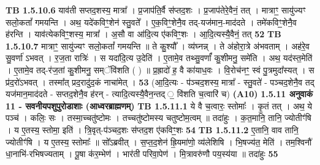 \documentclass[17pt]{extarticle}
\begin{document}
                  \newline
                                \textbf{ TB 1.5.10.6} \newline
                  याव॑ती सप्तद॒शस्य॒ मात्रा᳚ । प्र॒जाप॑ति॒र्वै स॑प्तद॒शः । प्र॒जाप॑तेरे॒वैनं॒ तत् । मात्राꣳ॒॒ सायु॑ज्यꣳ सलो॒कतां᳚ गमयन्ति । अथ॒ यदे॑कविꣳ॒॒शेन॑ स्तु॒वते᳚ । ए॒क॒विꣳ॒॒शेनै॒व तद्-यज॑मान॒-माद॑दते । तमे॑कविꣳ॒॒शेनै॒व ह॑रन्ति । याव॑त्येकविꣳ॒॒शस्य॒ मात्रा᳚ । अ॒सौ वा आ॑दि॒त्य ए॑कविꣳ॒॒शः । आ॒दि॒त्यस्यै॒वैनं॒ तत् \textbf{ 52} \newline
                  \newline
                                \textbf{ TB 1.5.10.7} \newline
                  मात्राꣳ॒॒ सायु॑ज्यꣳ सलो॒कतां᳚ गमयन्ति ॥ ते कु॒श्यौ᳚ । व्य॑घ्नन्न् । ते अ॑होरा॒त्रे अ॑भवताम् । अह॑रे॒व सु॒वर्णा॑ ऽभवत् । र॒ज॒ता रात्रिः॑ । स यदा॑दि॒त्य उ॒देति॑ । ए॒तामे॒व तथ्सु॒वर्णां᳚ कु॒शीमनु॒ समे॑ति । अथ॒ यद॑स्त॒मेति॑ । ए॒तामे॒व तद्-र॑ज॒तां कु॒शीमनु॒ सम्ॅवि॑शति ( ) ॥ प्र॒ह्रादो॑ ह॒ वै का॑याध॒वः । वि॒रोच॑नꣳ॒॒ स्वं पु॒त्रमुदा᳚स्यत् । स प्र॑द॒रो॑ऽभवत् । तस्मा᳚त् प्रद॒रादु॑द॒कं नाचा॑मेत् । \textbf{ 53} \newline
                  \newline
                                    (आ॒दि॒त्यः - प॑ञ्चद॒शस्य॒ मात्रा᳚ - स्तु॒वते॑ - पञ्चद॒शेनै॒व तद् यज॑मान॒माद॑दते - सप्तद॒शेनै॒व ह॑रन् - त्यादि॒त्यस्यै॒वैन॒न्तद् ॒ वि॑शति च॒त्वारि॑ च) \textbf{(A10)} \newline \newline
                \textbf{ 1.5.11    अनुवाकं   11 - सवनीयपशुपुरोडाशाः (आध्वरब्राह्मणम्)} \newline
                                \textbf{ TB 1.5.11.1} \newline
                  ये वै च॒त्वारः॒ स्तोमाः᳚ । कृ॒तं तत् । अथ॒ ये पञ्च॑ । कलिः॒ सः । तस्मा॒च्चतु॑ष्टोमः । तच्चतु॑ष्टोमस्य चतुष्टोम॒त्वम् ॥ तदा॑हुः । क॒त॒मानि॒ तानि॒ ज्योतीꣳ॑षि । य ए॒तस्य॒ स्तोमा॒ इति॑ । त्रि॒वृत्-प॑ञ्चद॒शः स॑प्तद॒श ए॑कविꣳ॒॒शः \textbf{ 54} \newline
                  \newline
                                \textbf{ TB 1.5.11.2} \newline
                  ए॒तानि॒ वाव तानि॒ ज्योतीꣳ॑षि । य ए॒तस्य॒ स्तोमाः᳚ ॥ सो᳚ऽब्रवीत् । स॒प्त॒द॒शेन॑ ह्रि॒यमा॑णो॒ व्य॑लेशिषि । भि॒षज्य॑त॒ मेति॑ । तम॒श्विनौ॑ धा॒नाभि॑-रभिषज्यताम् । पू॒षा क॑र॒म्भेण॑ । भार॑ती परिवा॒पेण॑ । मि॒त्रावरु॑णौ पय॒स्य॑या ॥ तदा॑हुः \textbf{ 55} \newline
                  \newline
\end{document}
